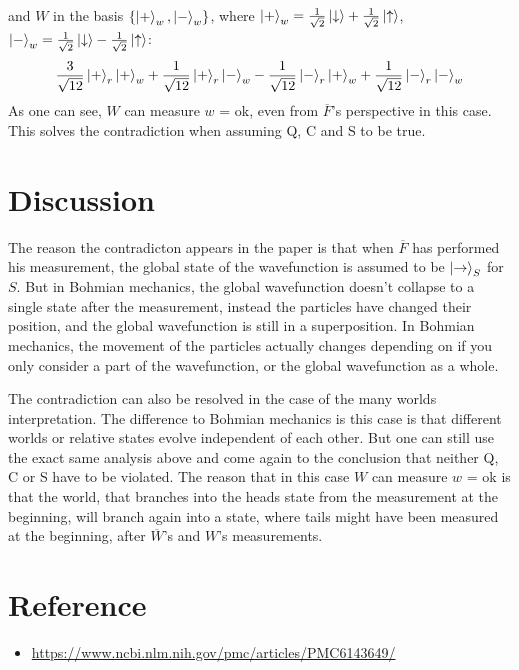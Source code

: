 \documentclass[a4paper]{article}
\begin{document}
and $W$ in the basis $\qty{\ket{+}_{w}, \ket{-}_{w}}$,
where $\ket{+}_{w} = \frac{1}{\sqrt{2}} \ket{\downarrow} + \frac{1}{\sqrt{2}} \ket{\uparrow}$, $\ket{-}_{w} = \frac{1}{\sqrt{2}} \ket{\downarrow} - \frac{1}{\sqrt{2}} \ket{\uparrow}$:
\begin{align*}
\frac{3}{\sqrt{12}}\ket{+}_{r}\ket{+}_{w} + \frac{1}{\sqrt{12}}\ket{+}_{r}\ket{-}_{w} - \frac{1}{\sqrt{12}}\ket{-}_{r}\ket{+}_{w} + \frac{1}{\sqrt{12}}\ket{-}_{r}\ket{-}_{w}
\end{align*}
As one can see, $W$ can measure $w$ = ok, even from $\overline{F}$'s perspective in this case.
This solves the contradiction when assuming Q, C and S to be true.

\section*{Discussion}
The reason the contradicton appears in the paper is that when $\overline{F}$ has performed his measurement, the global state of the wavefunction is assumed to be $\ket{\rightarrow}_S$ for $S$.
But in Bohmian mechanics, the global wavefunction doesn't collapse to a single state after the measurement, instead the particles have changed their position, and the global wavefunction is still in a superposition. In Bohmian mechanics, the movement of the particles actually changes depending on if you only consider a part of the wavefunction, or the global wavefunction as a whole.

The contradiction can also be resolved in the case of the many worlds interpretation. The difference to Bohmian mechanics is this case is that different worlds or relative states evolve independent of each other. But one can still use the exact same analysis above and come again to the conclusion that neither Q, C or S have to be violated. The reason that in this case $W$ can measure $w$ = ok is that the world, that branches into the heads state from the measurement at the beginning, will branch again into a state, where tails might have been measured at the beginning, after $\overline{W}$'s and $W$'s measurements.

\section*{Reference}
\begin{itemize}
	\item \url{https://www.ncbi.nlm.nih.gov/pmc/articles/PMC6143649/}
\end{itemize}
\end{document}
